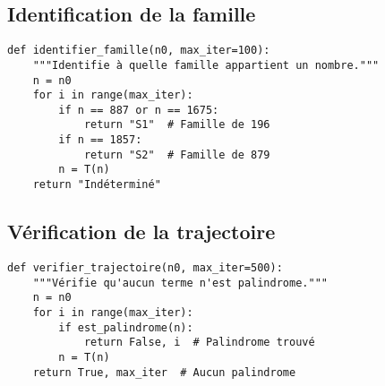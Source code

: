 \documentclass[12pt,a4paper]{article}
\theoremstyle{remark}
\begin{document}
\subsection{Identification de la famille}

\begin{verbatim}
def identifier_famille(n0, max_iter=100):
    """Identifie à quelle famille appartient un nombre."""
    n = n0
    for i in range(max_iter):
        if n == 887 or n == 1675:
            return "S1"  # Famille de 196
        if n == 1857:
            return "S2"  # Famille de 879
        n = T(n)
    return "Indéterminé"
\end{verbatim}

\subsection{Vérification de la trajectoire}

\begin{verbatim}
def verifier_trajectoire(n0, max_iter=500):
    """Vérifie qu'aucun terme n'est palindrome."""
    n = n0
    for i in range(max_iter):
        if est_palindrome(n):
            return False, i  # Palindrome trouvé
        n = T(n)
    return True, max_iter  # Aucun palindrome
\end{verbatim}
\end{document}
